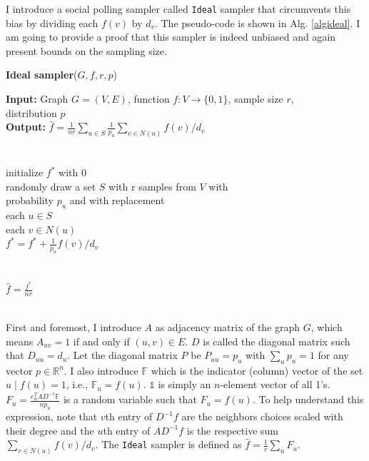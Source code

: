 I introduce a social polling sampler called \texttt{Ideal} sampler that circumvents this bias by dividing each $f(v)$ by $d_v$. The pseudo-code is shown in Alg. \ref{algideal}.
I am going to provide a proof that this sampler is indeed unbiased and again present bounds on the sampling size.
\begin{algorithm*}[!htb]
\caption{\small {\bf Ideal sampler}($G, f, r, p$)}
\begin{code}
{\bf Input:} Graph $G=(V,E)$, function $f : V \rightarrow \{0,1\}$, sample size $r$,\\ distribution $p$ \\
{\bf Output:} $\hat{f}=\frac{1}{nr}\sum\nolimits_{u\in S}\frac{1}{p_u}\sum\nolimits_{v\in N(u)} f(v)/d_v$\\
\\
\uln \>\ubegin\\
\uln \>\>initialize $f^*$ with 0 \\
\uln \>\>randomly draw a set $S$ with r samples from $V$ with\\
\>   \>\>\>probability $p_u$ and with replacement\\
\uln \>\>\ufor each $u \in S$ \udo\\
\uln \>\>\>\ufor each $v \in N(u)$ \udo\\
\uln \>\>\>\>$f^* = f^* + \frac{1}{p_u}f(v)/d_v$ \\
\uln \>\>\>\uend\\
\uln \>\>\uend\\
\uln \>\ureturn $\hat{f} = \frac{f^*}{nr}$ \\
\uln \>\uend\\ 
\end{code}
\label{algideal}
\end{algorithm*}

First and foremost, I introduce $A$ as adjacency matrix of the graph $G$, which means $A_{uv} = 1$ if and only if $(u,v) \in E$. $D$ is called the diagonal matrix such that $D_{uu} = d_u$.
Let the diagonal matrix $P$ be $P_{uu} = p_u$ with $\sum\nolimits_{u}p_u = 1$ for any vector $p \in \mathbb{R}^n$.
I also introduce $\mathds{F}$ which is the indicator (column) vector of the set ${u\;|\;f(u)=1}$, i.e., $\mathds{F}_u=f(u)$.
$\mathds{1}$ is simply an $n$-element vector of all 1's.
$F_u = \frac{e_u^TAD^{-1}\mathds{F}}{np_u}$ is a random variable such that $F_u = f(u)$.
To help understand this expression, note that $v$th entry of $D^{-1}f$ are the neighbors choices scaled with their degree and the $u$th entry of $AD^{-1}f$ is the respective sum $\sum_{v\in N(u)}f(v)/d_v$.
The \texttt{Ideal} sampler is defined as $\hat{f} = \frac{1}{r}\sum_{u}F_u$.

